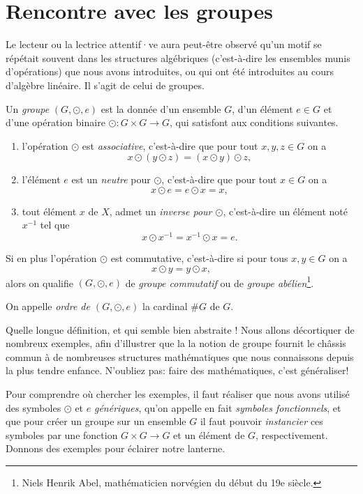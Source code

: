 \documentclass[french,course,oneside,theoremnosection]{lecture}
\begin{document}


\section{Rencontre avec les groupes}

Le lecteur ou la lectrice attentif·ve aura peut-être observé qu'un motif se répétait souvent dans les structures algébriques (c'est-à-dire les ensembles munis d'opérations) que nous avons introduites, ou qui ont été introduites au cours d'algèbre linéaire. Il s'agit de celui de groupes.

\begin{definition}\label{defn:groupe}
Un \emph{groupe} $(G, \odot, e)$ est la donnée d'un ensemble $G$, d'un élément $e\in G$ et d'une opération binaire $\odot \colon G  \times G \to G$, qui satisfont aux conditions suivantes.
\begin{enumerate}
\item l'opération $\odot $ est \emph{associative}, c'est-à-dire que pour tout $x,y,z \in G$ on a 
\[
x\odot(y\odot z) = (x\odot y) \odot z,
\]
\item l'élément $e$ est un  \emph{neutre} pour $\odot$, c'est-à-dire que pour tout $x\in G$ on a
\[
x \odot e = e \odot x = x,
\]
\item tout élément $x$ de $X$,  admet un \emph{inverse pour $\odot$}, c'est-à-dire un élément noté $x^{-1}$ tel que
\[
x\odot x^{-1} = x^{-1} \odot x = e.
\]
\end{enumerate}
Si en plus l'opération $\odot$ est commutative, c'est-à-dire si pour tous $x, y \in G$ on a 
\[
x \odot y = y \odot x, 
\]
alors on qualifie $(G, \odot, e)$ de \emph{groupe commutatif} ou de \emph{groupe abélien}\footnote{Niels Henrik Abel, mathématicien norvégien du début du 19e siècle.}.

On appelle \emph{ordre de $(G, \odot, e)$} la cardinal $\#G$ de $G$.

\end{definition} 
Quelle longue définition, et qui semble bien abstraite ! Nous allons décortiquer de nombreux exemples, afin d'illustrer que la la notion de groupe fournit le châssis commun à de nombreuses structures mathématiques que nous connaissons depuis la plus tendre enfance. N'oubliez pas: faire des mathématiques, c'est généraliser!

Pour comprendre où chercher les exemples, il faut réaliser que nous avons utilisé des symboles $\odot$ et $e$ \emph{génériques}, qu'on appelle en fait \emph{symboles fonctionnels}, et que pour créer un groupe sur un ensemble $G$ il faut pouvoir \emph{instancier} ces symboles par une fonction $G \times G \to G$ et un élément de $G$, respectivement. Donnons des exemples pour éclairer notre lanterne.
\end{document}
